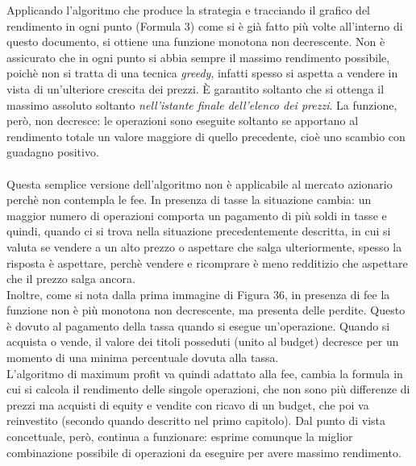 \documentclass[a4paper,12pt]{report}
\begin{document}
\begin{fig}
Applicando l'algoritmo che produce la strategia e tracciando il grafico del rendimento in ogni punto (Formula 3) come si è già fatto più volte all'interno di questo documento, si ottiene una funzione monotona non decrescente. Non è assicurato che in ogni punto si abbia sempre il massimo rendimento possibile, poichè non si tratta di una tecnica \textit{greedy}, infatti spesso si aspetta a vendere in vista di un'ulteriore crescita dei prezzi. È garantito soltanto che si ottenga il massimo assoluto soltanto \textit{nell'istante finale dell'elenco dei prezzi}. La funzione, però, non decresce: le operazioni sono eseguite soltanto se apportano al rendimento totale un valore maggiore di quello precedente, cioè uno scambio con guadagno positivo.
\\~\\ Questa semplice versione dell'algoritmo non è applicabile al mercato azionario perchè non contempla le fee. In presenza di tasse la situazione cambia: un maggior numero di operazioni comporta un pagamento di più soldi in tasse e quindi, quando ci si trova nella situazione precedentemente descritta, in cui si valuta se vendere a un alto prezzo o aspettare che salga ulteriormente, spesso la risposta è aspettare, perchè vendere e ricomprare è meno redditizio che aspettare che il prezzo salga ancora.\\
Inoltre, come si nota dalla prima immagine di Figura 36, in presenza di fee la funzione non è più monotona non decrescente, ma presenta delle perdite. Questo è dovuto al pagamento della tassa quando si esegue un'operazione. Quando si acquista o vende, il valore dei titoli posseduti (unito al budget) decresce per un momento di una minima percentuale dovuta alla tassa.\\L'algoritmo di maximum profit va quindi adattato alla fee, cambia la formula in cui si calcola il rendimento delle singole operazioni, che non sono più differenze di prezzi ma acquisti di equity e vendite con ricavo di un budget, che poi va reinvestito (secondo quando descritto nel primo capitolo). Dal punto di vista concettuale, però, continua a funzionare: esprime comunque la miglior combinazione possibile di operazioni da eseguire per avere massimo rendimento.


\end{fig}
\end{document}
